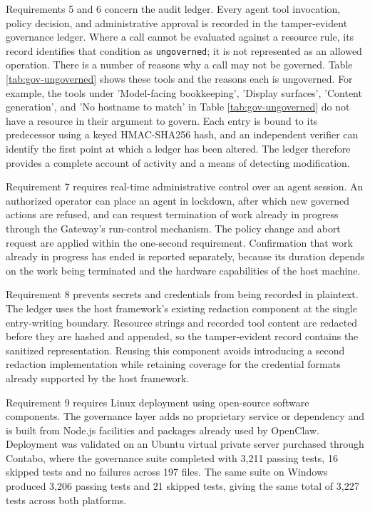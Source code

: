 Requirements 5 and 6 concern the audit ledger. Every agent tool invocation,
policy decision, and administrative approval is recorded in the tamper-evident governance ledger.
Where a call cannot be evaluated against a resource rule, its record identifies
that condition as \texttt{ungoverned}; it is not represented as an allowed
operation. There is a number of reasons why a call may not be governed. Table \ref{tab:gov-ungoverned} shows these tools and the reasons each is ungoverned. For example, the tools under 'Model-facing bookkeeping', 'Display surfaces', 'Content generation', and 'No hostname to match' in Table \ref{tab:gov-ungoverned} do not have a resource in their argument to govern. Each entry is bound to its predecessor using a keyed HMAC-SHA256 hash,
and an independent verifier can identify the first point at which a ledger has
been altered. The ledger therefore provides a complete account of activity and a
means of detecting modification.

Requirement 7 requires real-time administrative control over an agent session.
An authorized operator can place an agent in lockdown, after which new governed actions
are refused, and can request termination of work already in progress through the
Gateway's run-control mechanism. The policy change and abort request are applied
within the one-second requirement. Confirmation that work already in progress has
ended is reported separately, because its duration depends on the work being
terminated and the hardware capabilities of the host machine.

Requirement 8 prevents secrets and credentials from being recorded in plaintext.
The ledger uses the host framework's existing redaction component at the single
entry-writing boundary. Resource strings and recorded tool content are redacted
before they are hashed and appended, so the tamper-evident record contains the
sanitized representation. Reusing this component avoids introducing a second
redaction implementation while retaining coverage for the credential formats
already supported by the host framework.

Requirement 9 requires Linux deployment using open-source software components.
The governance layer adds no proprietary service or dependency and is built from
Node.js facilities and packages already used by OpenClaw. Deployment was validated
on an Ubuntu virtual private server purchased through Contabo, where the governance suite completed with
3,211 passing tests, 16 skipped tests and no failures across 197 files. The same
suite on Windows produced 3,206 passing tests and 21 skipped tests, giving the
same total of 3,227 tests across both platforms.

